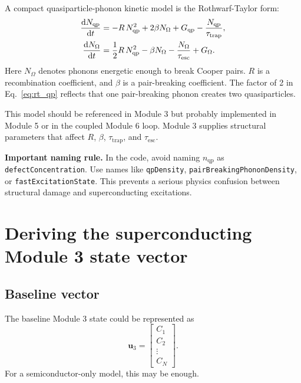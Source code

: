 \documentclass[11pt]{article}
\begin{document}
A compact quasiparticle-phonon kinetic model is the Rothwarf-Taylor form:
\begin{align}
\dv{N_{\mathrm{qp}}}{t}
&= -R\,N_{\mathrm{qp}}^2 + 2\beta N_{\Omega}+G_{\mathrm{qp}}-\frac{N_{\mathrm{qp}}}{\tau_{\mathrm{trap}}},
\label{eq:rt_qp}\\
\dv{N_{\Omega}}{t}
&= \frac{1}{2}R\,N_{\mathrm{qp}}^2 - \beta N_{\Omega}-\frac{N_{\Omega}}{\tau_{\mathrm{esc}}}+G_{\Omega}.
\label{eq:rt_ph}
\end{align}
Here $N_{\Omega}$ denotes phonons energetic enough to break Cooper pairs. $R$ is a recombination coefficient, and $\beta$ is a pair-breaking coefficient. The factor of 2 in Eq.~\eqref{eq:rt_qp} reflects that one pair-breaking phonon creates two quasiparticles.

This model should be referenced in Module 3 but probably implemented in Module 5 or in the coupled Module 6 loop. Module 3 supplies structural parameters that affect $R$, $\beta$, $\tau_{\mathrm{trap}}$, and $\tau_{\mathrm{esc}}$.

\begin{notebox}
\textbf{Important naming rule.} In the code, avoid naming $n_{\mathrm{qp}}$ as \texttt{defectConcentration}. Use names like \texttt{qpDensity}, \texttt{pairBreakingPhononDensity}, or \texttt{fastExcitationState}. This prevents a serious physics confusion between structural damage and superconducting excitations.
\end{notebox}

\section{Deriving the superconducting Module 3 state vector}

\subsection{Baseline vector}

The baseline Module 3 state could be represented as
\begin{equation}
\mathbf{u}_{3}=\begin{bmatrix}
C_1 \\ C_2 \\ \vdots \\ C_N
\end{bmatrix}.
\label{eq:baseline_state_vector}
\end{equation}
For a semiconductor-only model, this may be enough.
\end{document}
